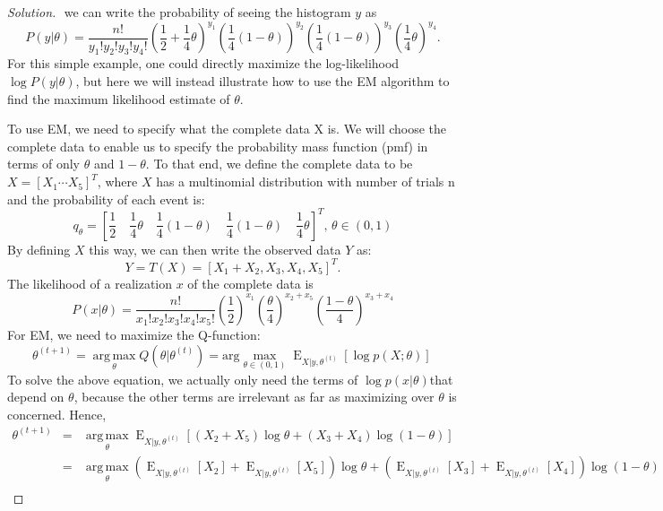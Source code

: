 \documentclass[11pt]{article}
\begin{document}
\begin{proof}[Solution]\let\qed\relax
$ $
we can write the probability of seeing
the histogram $y$ as
$$
P(y|\theta) = \frac{n!}{y_1!y_2!y_3!y_4!}\left(\frac{1}{2}+\frac{1}{4}\theta\right)^{y_1}\left(\frac{1}{4}\left(1-\theta\right)\right)^{y_2}\left(\frac{1}{4}\left(1-\theta\right)\right)^{y_3}\left(\frac{1}{4}\theta\right)^{y_4}.
$$
For this simple example, one could directly maximize the log-likelihood $\log P(y|\theta)$, but here we will instead illustrate how to use the EM algorithm
to find the maximum likelihood estimate of $\theta$.

To use EM, we need to specify what the complete data X is. We will
choose the complete data to enable us to specify the probability mass
function (pmf) in terms of only $\theta$ and $1-\theta$. To that end, we define the complete data to be $X = [X_1 \cdots X_5]^T$, where $X$ has a multinomial distribution with number of trials n and the probability of each event
is:
$$
q_\theta = \left[\frac{1}{2}\quad \frac{1}{4}\theta\quad \frac{1}{4}\left(1-\theta\right)\quad \frac{1}{4}\left(1-\theta\right) \quad \frac{1}{4}\theta \right]^T,\, \theta\in(0,1)
$$
By defining $X$ this way, we can then write the observed data $Y$ as: $$Y = T(X) =  [X_1+X_2,  X_3,X_4, X_5]^T.$$
The likelihood of a realization $x$ of the complete data is
$$
P(x|\theta) = \frac{n!}{x_1!x_2!x_3!x_4!x_5!}\left(\frac{1}{2}\right)^{x_1}\left(\frac{\theta}{4}\right)^{x_2+x_5}\left(\frac{1-\theta}{4}\right)^{x_3+x_4}
$$
For EM, we need to maximize the Q-function:
$$
\theta^{(t+1)} = \underset{\theta}{\operatorname{arg\,max}}Q(\theta|\theta^{(t)}) =  \mbox{arg}\max\limits_{\theta \in (0,1)}\operatorname{E}_{{X}|{y},\theta^{(t)}}\left[ \log p (X;\theta) \right] \,
$$
To solve the above equation, we actually only need the terms of $\log p(x|\theta)$that depend on $\theta$, because the other terms are irrelevant
as far as maximizing over $\theta$ is concerned. Hence, 
\begin{eqnarray*}
\theta^{(t+1)} &=& \underset{\theta}{\operatorname{arg\,max}}\operatorname{E}_{{X}|{y},\theta^{(t)}}\left[ (X_2+X_5)\log\theta+(X_3+X_4)\log(1-\theta) \right] \, \\
&=& \underset{\theta}{\operatorname{arg\,max}}\left(\operatorname{E}_{{X}|{y},\theta^{(t)}}\left[ X_2\right]+\operatorname{E}_{{X}|{y},\theta^{(t)}}\left[ X_5\right]\right)\log\theta+\left(\operatorname{E}_{{X}|{y},\theta^{(t)}}\left[ X_3\right]+\operatorname{E}_{{X}|{y},\theta^{(t)}}\left[ X_4\right]\right)\log(1-\theta) \\

\end{eqnarray*}
\end{proof}
\end{document}
